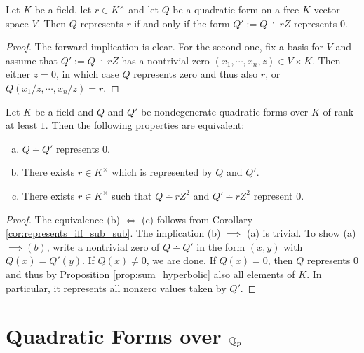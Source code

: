 \begin{corollary}\label{cor:represents_iff_sub_sub}
\leanok
Let $K$ be a field, let $r \in K^\times$ and let $Q$ be a quadratic form on a free $K$-vector space $V$. Then $Q$ represents $r$ if and only if the form $Q' := Q \dotminus rZ$ represents $0$.
\end{corollary}
\begin{proof}
The forward implication is clear. For the second one, fix a basis for $V$ and assume that $Q' := Q \dotminus rZ$ has a nontrivial zero $(x_1, \cdots, x_n, z) \in V \times K$. Then either $z = 0$, in which case $Q$ represents zero and thus also $r$, or $Q(x_1/z, \cdots, x_n/z) = r$.
\end{proof}

\begin{corollary}\label{cor:prod_isotropic_iff}
\leanok
Let $K$ be a field and $Q$ and $Q'$ be nondegenerate quadratic forms over $K$ of rank at least $1$. Then the following properties are equivalent:
\begin{enumerate}[a)]
\item $Q \dotminus Q'$ represents $0$.
\item There exists $r \in K^\times$ which is represented by $Q$ and $Q'$.
\item There exists $r \in K^\times$ such that $Q \dotminus rZ^2$ and $Q' \dotminus rZ^2$ represent $0$.
\end{enumerate}
\end{corollary}

\begin{proof}
\leanok
{}
The equivalence (b) $\iff$ (c) follows from Corollary \ref{cor:represents_iff_sub_sub}. The implication (b) $\implies$ (a) is trivial. To show (a) $\implies (b)$, write a nontrivial zero of $Q \dotminus Q'$ in the form $(x, y)$ with $Q(x) = Q'(y)$. If $Q(x) \ne 0$, we are done. If $Q(x) = 0$, then $Q$ represents $0$ and thus by Proposition \ref{prop:sum_hyperbolic} also all elements of $K$. In particular, it represents all nonzero values taken by $Q'$.
\end{proof}

\section[Quadratic Forms over the p-adics]{Quadratic Forms over $\mathbb{Q}_p$}\label{sec:quadratic_form_padic}

